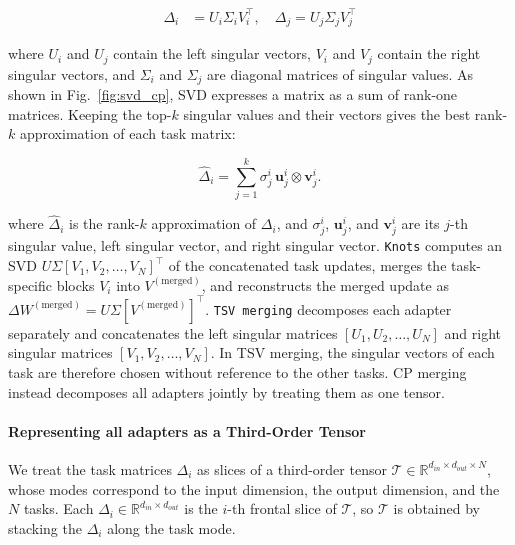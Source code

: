 \documentclass[10pt]{article} %
\begin{document}
    \begin{align}
        \Delta_{i} & = U_{i}\Sigma_{i}V_{i}^{\top}, \quad \Delta_{j}= U_{j}\Sigma_{j}V_{j}^{\top}
    \end{align}

    where $U_{i}$ and $U_{j}$ contain the left singular vectors, $V_{i}$ and $V_{j}$
    contain the right singular vectors, and $\Sigma_{i}$ and $\Sigma_{j}$ are diagonal
    matrices of singular values. As shown in Fig.~\ref{fig:svd_cp}, SVD expresses a
    matrix as a sum of rank-one matrices. Keeping the top-$k$ singular values and
    their vectors gives the best rank-$k$ approximation of each task matrix:

    \begin{equation}
        \hat{\Delta}_{i}= \sum_{j=1}^{k}\sigma_{j}^{i}\, \mathbf{u}_{j}^{i}\otimes
        {\mathbf{v}_j^i}.
    \end{equation}
    
    where $\hat{\Delta}_{i}$ is the rank-$k$ approximation of $\Delta_{i}$, and
    $\sigma_{j}^{i}$, $\mathbf{u}_{j}^{i}$, and $\mathbf{v}_{j}^{i}$ are its $j$-th
    singular value, left singular vector, and right singular vector.
    \texttt{Knots} computes an SVD $U\Sigma[V_1,V_2,\ldots,V_N]^{\top}$ of the concatenated task updates, merges the task-specific blocks $V_i$ into $V^{(\text{merged})}$, and reconstructs the merged update as $\Delta W^{(\text{merged})} = U\Sigma[V^{(\text{merged})}]^{\top}$. \texttt{TSV merging} decomposes each adapter separately and concatenates the left singular matrices $[U_1,U_2,\ldots,U_N]$ and right singular matrices $[V_1,V_2,\ldots,V_N]$. In TSV merging, the singular vectors of each task are therefore chosen without reference to the other tasks. CP merging instead decomposes all adapters jointly by treating them as one tensor.

    \paragraph{Representing all adapters as a Third-Order Tensor}
    
    We treat the task matrices $\Delta_{i}$ as slices of a third-order tensor
    $\mathcal{T}\in\mathbb{R}^{d_{in}\times d_{out}\times N}$, whose modes
    correspond to the input dimension, the output dimension, and the $N$ tasks.
    Each $\Delta_{i}\in\mathbb{R}^{d_{in}\times d_{out}}$ is the $i$-th frontal
    slice of $\mathcal{T}$, so $\mathcal{T}$ is obtained by stacking the
    $\Delta_{i}$ along the task mode.
\end{document}
